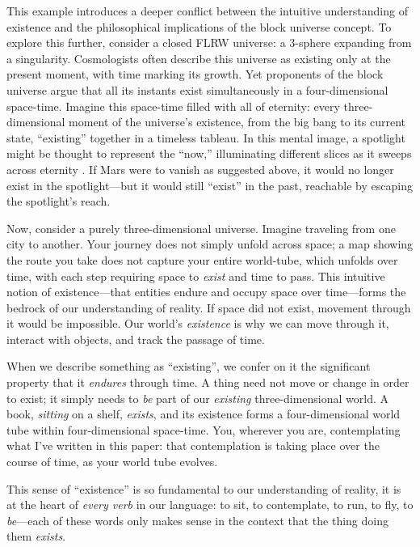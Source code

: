 \documentclass[aps,rmp,groupedaddress,twocolumn,10pt]{revtex4-2}
\begin{document}
This example introduces a deeper conflict between the intuitive understanding of existence and the philosophical implications of the block universe concept. To explore this further, consider a closed FLRW universe: a 3-sphere expanding from a singularity. Cosmologists often describe this universe as existing only at the present moment, with time marking its growth. Yet proponents of the block universe argue that all its instants exist simultaneously in a four-dimensional space-time. Imagine this space-time filled with all of eternity: every three-dimensional moment of the universe's existence, from the big bang to its current state, ``existing'' together in a timeless tableau. In this mental image, a spotlight might be thought to represent the ``now,'' illuminating different slices as it sweeps across eternity \cite{Price2011}. If Mars were to vanish as suggested above, it would no longer exist in the spotlight---but it would still ``exist'' in the past, reachable by escaping the spotlight's reach. 

Now, consider a purely three-dimensional universe. Imagine traveling from one city to another. Your journey does not simply unfold across space; a map showing the route you take does not capture your entire world-tube, which unfolds over time, with each step requiring space to \textit{exist} and time to pass. This intuitive notion of existence---that entities endure and occupy space over time---forms the bedrock of our understanding of reality. If space did not exist, movement through it would be impossible. Our world's \textit{existence} is why we can move through it, interact with objects, and track the passage of time.

When we describe something as ``existing'', we confer on it the significant property that it \textit{endures} through time. A thing need not move or change in order to exist; it simply needs to \textit{be} part of our \textit{existing} three-dimensional world. A book, \textit{sitting} on a shelf, \textit{exists}, and its existence forms a four-dimensional world tube within four-dimensional space-time. You, wherever you are, contemplating what I've written in this paper: that contemplation is taking place over the course of time, as your world tube evolves.

This sense of ``existence'' is so fundamental to our understanding of reality, it is at the heart of \textit{every verb} in our language: to sit, to contemplate, to run, to fly, to \textit{be}---each of these words only makes sense in the context that the thing doing them \textit{exists}. 
\end{document}
